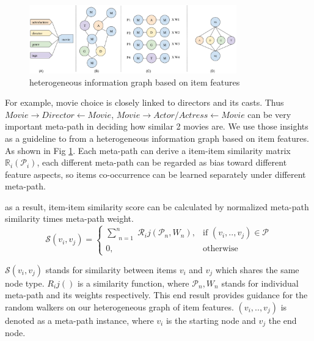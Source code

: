 \begin{figure}[!t]
    \centering
    \includegraphics[width=0.8\textwidth]{figs/fig1.png}
    \caption{heterogeneous information graph based on item features}\label{fig:fe-graph}
\end{figure}

For example, movie choice is closely linked to directors and its casts. Thus $Movie \rightarrow Director \leftarrow Movie$, $Movie \rightarrow Actor/Actress \leftarrow Movie$  can be very important meta-path in deciding how similar 2 movies are. We use those insights as a guideline to from a heterogeneous information graph based on item features. As shown in Fig \ref{fig:fe-graph}.
Each meta-path can derive a item-item similarity matrix $\mathbb{R}_i(\mathcal{P}_i)$, each different meta-path can be regarded as bias toward different feature aspects, so items co-occurrence can be learned separately under different meta-path.

as a result, item-item similarity score can be calculated by normalized meta-path similarity times meta-path weight.
\begin{equation}\label{itemsim}
    \mathcal{S}(v_i,v_j) = 
    \begin{cases}
         \sum\limits_{\substack{n=1}}^{n} \mathcal{R}_ij(\mathcal{P}_n,{W_n}),& \text{if } (v_{i}, .., v_{j}) \in \mathcal{P} \\
         0,              & \text{otherwise}
     \end{cases}
\end{equation}

$\mathcal{S}(v_i,v_j)$ stands for similarity between items $v_i$ and $v_j$ which shares the same node type. $R_ij()$ is a similarity function, where $\mathcal{P}_n, {W_n}$ stands for individual meta-path and its weights respectively. This end result provides guidance for the random walkers on our heterogeneous graph of item features. $(v_{i}, .., v_{j})$ is denoted as a meta-path instance, where $v_i$ is the starting node and $v_j$ the end node.

